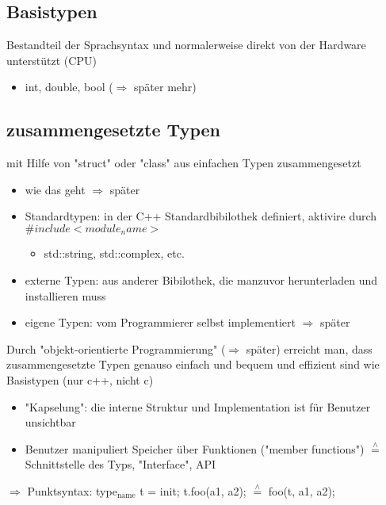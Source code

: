 \documentclass[a4paper]{scrartcl}
\newcommand{\estimates}{\overset{\scriptscriptstyle\wedge}{=}}%
\begin{document}
\subsection{Basistypen}
\label{sec-9-1}
Bestandteil der Sprachsyntax und normalerweise direkt von der Hardware unterstützt (CPU)
\begin{itemize}
\item int, double, bool ($\Rightarrow$ später mehr)
\end{itemize}
\subsection{zusammengesetzte Typen}
\label{sec-9-2}
mit Hilfe von "struct" oder "class" aus einfachen Typen zusammengesetzt
\begin{itemize}
\item wie das geht $\Rightarrow$ später
\item Standardtypen: in der C++ Standardbibilothek definiert, aktivire durch $\#include <module_name>$
\begin{itemize}
\item std::string, std::complex, etc.
\end{itemize}
\item externe Typen: aus anderer Bibilothek, die manzuvor herunterladen und installieren muss
\item eigene Typen: vom Programmierer selbst implementiert $\Rightarrow$ später
\end{itemize}
Durch "objekt-orientierte Programmierung" ($\Rightarrow$ später) erreicht man, dass zusammengesetzte Typen genauso einfach und bequem und effizient sind wie Basistypen (nur c++, nicht c)
\begin{itemize}
\item "Kapselung": die interne Struktur und Implementation ist für Benutzer unsichtbar
\item Benutzer manipuliert Speicher über Funktionen ("member functions") $\estimates$ Schnittstelle des Typs, "Interface", API
\end{itemize}

$\Rightarrow$ Punktsyntax: type$_{\text{name}}$ t = init; t.foo(a1, a2); $\estimates$ foo(t, a1, a2);
\end{document}
